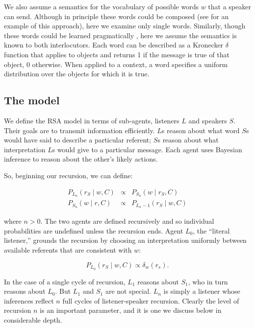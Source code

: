 \documentclass[man,noapacite]{apa2}
\begin{document}
We also assume a semantics for the vocabulary of possible words $w$ that a speaker can send. Although in principle these words could be composed (see  for an example of this approach), here we examine only single words. Similarly, though these words could be learned pragmatically \cite{frank2014,smith2013}, here we assume the semantics is known to both interlocutors. Each word can be described as a Kronecker $\delta$ function that applies to objects and returns 1 if the message is true of that object, 0 otherwise. When applied to a context, a word specifies a uniform distribution over the objects for which it is true.

\subsection{The model}

We define the RSA model in terms of sub-agents, listeners $L$ and speakers $S$. Their goals are to transmit information efficiently. $L$s reason about what word $S$s would have said to describe a particular referent; $S$s reason about what interpretation $L$s would give to a particular message. Each agent uses Bayesian inference to reason about the other's likely actions.

So, beginning our recursion, we can define:

\begin{eqnarray}
    \label{eq:agents}
    P_{L_n}(r_S \mid w, C) & \propto  & P_{S_n} (w \mid r_S, C)\\
    P_{S_n}(w \mid r, C) & \propto & P_{L_n-1} (r_S \mid w, C)
\end{eqnarray}

\noindent where $n > 0$. The two agents are defined recursively and so individual probabilities are undefined unless the recursion ends.  Agent $L_0$, the ``literal listener,'' grounds the recursion by choosing an interpretation uniformly between available referents that are consistent with $w$:

\begin{equation}
P_{L_0}(r_S \mid w, C) \propto \delta_w(r_s).
\end{equation}

In the case of a single cycle of recursion, $L_1$ reasons about $S_1$, who in turn reasons about $L_0$. But $L_1$ and $S_1$ are not special. $L_n$ is simply a listener whose inferences reflect $n$ full cycles of listener-speaker recursion. Clearly the level of recursion $n$ is an important parameter, and it is one we discuss below in considerable depth.
\end{document}
